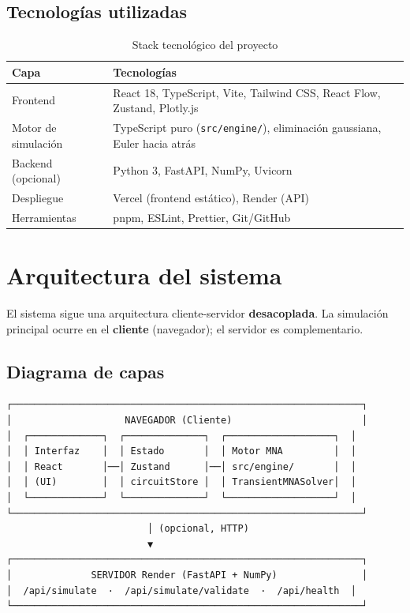 \documentclass[12pt,a4paper]{article}
\begin{document}
\subsection{Tecnologías utilizadas}

\begin{table}[H]
  \centering
  \begin{tabularx}{\textwidth}{lX}
    \toprule
    \textbf{Capa} & \textbf{Tecnologías} \\
    \midrule
    Frontend & React 18, TypeScript, Vite, Tailwind CSS, React Flow, Zustand, Plotly.js \\
    Motor de simulación & TypeScript puro (\texttt{src/engine/}), eliminación gaussiana, Euler hacia atrás \\
    Backend (opcional) & Python 3, FastAPI, NumPy, Uvicorn \\
    Despliegue & Vercel (frontend estático), Render (API) \\
    Herramientas & pnpm, ESLint, Prettier, Git/GitHub \\
    \bottomrule
  \end{tabularx}
  \caption{Stack tecnológico del proyecto}
\end{table}

\section{Arquitectura del sistema}

El sistema sigue una arquitectura cliente-servidor \textbf{desacoplada}. La simulación principal ocurre en el \textbf{cliente} (navegador); el servidor es complementario.

\subsection{Diagrama de capas}

\begin{verbatim}
┌──────────────────────────────────────────────────────────────┐
│                    NAVEGADOR (Cliente)                       │
│  ┌─────────────┐  ┌──────────────┐  ┌───────────────────┐  │
│  │ Interfaz    │  │ Estado       │  │ Motor MNA         │  │
│  │ React       │──│ Zustand      │──│ src/engine/       │  │
│  │ (UI)        │  │ circuitStore │  │ TransientMNASolver│  │
│  └─────────────┘  └──────────────┘  └───────────────────┘  │
└──────────────────────────────────────────────────────────────┘
                         │ (opcional, HTTP)
                         ▼
┌──────────────────────────────────────────────────────────────┐
│              SERVIDOR Render (FastAPI + NumPy)               │
│  /api/simulate  ·  /api/simulate/validate  ·  /api/health  │
└──────────────────────────────────────────────────────────────┘
\end{verbatim}
\end{document}
